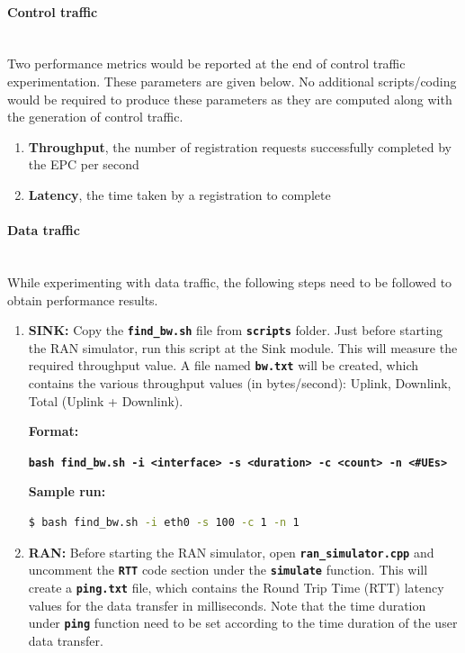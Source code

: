 \pdfminorversion=4\documentclass[hidelinks]{report}
\newcommand{\cf}[1] {
	\textbf{\texttt{#1}}
}
\begin{document}
\paragraph*{Control traffic}

~\\ Two performance metrics would be reported at the end of control traffic experimentation. These parameters are given below. No additional scripts/coding would be required to produce these parameters as they are computed along with the generation of control traffic. 

\begin{enumerate}

\item \textbf{Throughput}, the number of registration requests successfully completed by the EPC per second

\item \textbf{Latency}, the time taken by a registration to complete

\end{enumerate}

\paragraph*{Data traffic}

~\\ While experimenting with data traffic, the following steps need to be followed to obtain performance results.

\begin{enumerate}

\item \textbf{SINK:} Copy the \cf{find\_bw.sh} file from \cf{scripts} folder. Just before starting the RAN simulator, run this script at the Sink module. This will measure the required throughput value. A file named \cf{bw.txt} will be created, which contains the various throughput values (in bytes/second): Uplink, Downlink, Total (Uplink + Downlink). 

\textbf{Format:}
\begin{center}

\cf{bash find\_bw.sh -i <interface> -s <duration> -c <count> -n <\#UEs>} 

\end{center}

\textbf{Sample run:}

\begin{lstlisting}[language=bash]
$ bash find_bw.sh -i eth0 -s 100 -c 1 -n 1
\end{lstlisting}

\item \textbf{RAN:} Before starting the RAN simulator, open \cf{ran\_simulator.cpp} and uncomment the \cf{RTT} code section under the \cf{simulate} function. This will create a \cf{ping.txt} file, which contains the Round Trip Time (RTT) latency values for the data transfer in milliseconds. Note that the time duration under \cf{ping} function need to be set according to the time duration of the user data transfer.

\end{enumerate}
\end{document}

